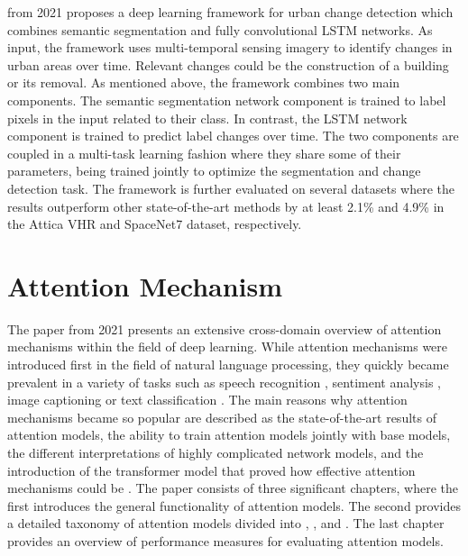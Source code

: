  \cite{9352207} from 2021 proposes a deep learning framework for urban change detection which combines semantic segmentation and fully convolutional LSTM networks. As input, the framework uses multi-temporal sensing imagery to identify changes in urban areas over time. Relevant changes could be the construction of a building or its removal.
As mentioned above, the framework combines two main components. The semantic segmentation network component is trained to label pixels in the input related to their class. In contrast, the LSTM network component is trained to predict label changes over time. The two components are coupled in a multi-task learning fashion where they share some of their parameters, being trained jointly to optimize the segmentation and change detection task. The framework is further evaluated on several datasets where the results outperform other state-of-the-art methods by at least 2.1\% and 4.9\% in the Attica VHR and SpaceNet7 \cite{https://doi.org/10.48550/arxiv.1807.01232} dataset, respectively.

\section{Attention Mechanism}
The paper  \cite{NIU202148} from 2021 presents an extensive cross-domain overview of attention mechanisms within the field of deep learning. While attention mechanisms were introduced first in the field of natural language processing, they quickly became prevalent in a variety of tasks such as speech recognition \cite{chorowski2015attention}, sentiment analysis \cite{letarte2018importance}, image captioning \cite{huang2019attention} or text classification \cite{liu2019bidirectional}. The main reasons why attention mechanisms became so popular are described as the state-of-the-art results of attention models, the ability to train attention models jointly with base models, the different interpretations of highly complicated network models, and the introduction of the transformer model that proved how effective attention mechanisms could be \cite{vaswani2017attention}. The paper consists of three significant chapters, where the first introduces the general functionality of attention models. The second provides a detailed taxonomy of attention models divided into , , and . The last chapter provides an overview of performance measures for evaluating attention models.

